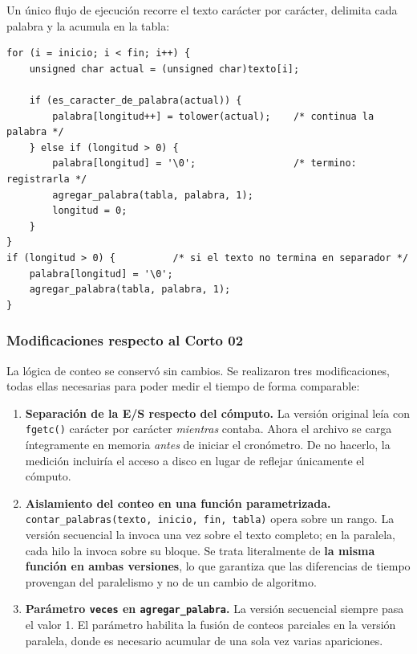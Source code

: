 \documentclass[11pt,letterpaper]{article}
\begin{document}
Un único flujo de ejecución recorre el texto carácter por carácter, delimita cada
palabra y la acumula en la tabla:

\begin{lstlisting}[caption={Núcleo del conteo, idéntico en ambas versiones}]
for (i = inicio; i < fin; i++) {
    unsigned char actual = (unsigned char)texto[i];

    if (es_caracter_de_palabra(actual)) {
        palabra[longitud++] = tolower(actual);    /* continua la palabra */
    } else if (longitud > 0) {
        palabra[longitud] = '\0';                 /* termino: registrarla */
        agregar_palabra(tabla, palabra, 1);
        longitud = 0;
    }
}
if (longitud > 0) {          /* si el texto no termina en separador */
    palabra[longitud] = '\0';
    agregar_palabra(tabla, palabra, 1);
}
\end{lstlisting}

\subsubsection{Modificaciones respecto al Corto 02}

La lógica de conteo se conservó sin cambios. Se realizaron tres modificaciones,
todas ellas necesarias para poder medir el tiempo de forma comparable:

\begin{enumerate}[label=\textbf{(\alph*)}]
  \item \textbf{Separación de la E/S respecto del cómputo.} La versión original
        leía con \texttt{fgetc()} carácter por carácter \emph{mientras} contaba.
        Ahora el archivo se carga íntegramente en memoria \emph{antes} de iniciar
        el cronómetro. De no hacerlo, la medición incluiría el acceso a disco en
        lugar de reflejar únicamente el cómputo.
  \item \textbf{Aislamiento del conteo en una función parametrizada.}
        \texttt{contar\_palabras(texto, inicio, fin, tabla)} opera sobre un rango.
        La versión secuencial la invoca una vez sobre el texto completo; en la
        paralela, cada hilo la invoca sobre su bloque. Se trata literalmente de
        \textbf{la misma función en ambas versiones}, lo que garantiza que las
        diferencias de tiempo provengan del paralelismo y no de un cambio de
        algoritmo.
  \item \textbf{Parámetro \texttt{veces} en \texttt{agregar\_palabra}.} La versión
        secuencial siempre pasa el valor 1. El parámetro habilita la fusión de
        conteos parciales en la versión paralela, donde es necesario acumular de
        una sola vez varias apariciones.
\end{enumerate}
\end{document}
